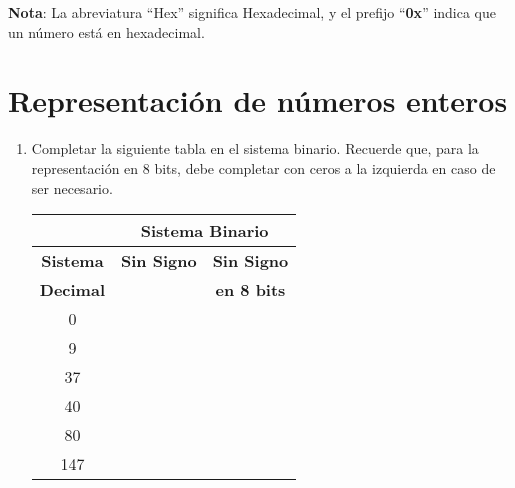 \documentclass[12pt]{article}
\begin{document}
\textbf{Nota}: La abreviatura ``Hex'' significa Hexadecimal, y el prefijo
``\textbf{0x}'' indica que un número está en hexadecimal.


\section{Representación de números enteros}

\begin{enumerate}

    \item Completar la siguiente tabla en el sistema binario. Recuerde que,
        para la representación en 8 bits, debe completar con ceros a la
        izquierda en caso de ser necesario.

    \begin{center}

        \begin{tabular}[t]{|c|c|c|}

        \hline

            &\multicolumn{2}{|c|}{\textbf{Sistema Binario}}\\

        \hline

            \textbf{Sistema} & \textbf{Sin Signo}& \textbf{Sin Signo}\\

            \textbf{Decimal} & ~ & \textbf{en 8 bits}\\

        \hline

            0 & \hspace{14em}~&\hspace{14em}~\\

        \hline

            9&&\\

        \hline

            37&&\\

        \hline

            40&&\\

        \hline

            80&&\\

        \hline

            147&&\\

        \hline


\end{tabular}
\end{center}
\end{enumerate}
\end{document}
